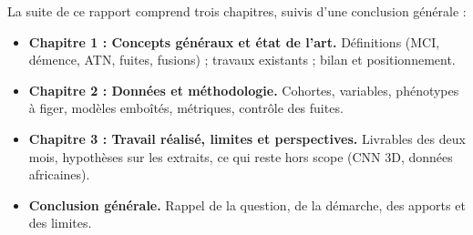 La suite de ce rapport comprend trois chapitres, suivis d'une conclusion générale :
\begin{itemize}
\item \textbf{Chapitre 1 : Concepts généraux et état de l'art.}
Définitions (MCI, démence, \ac{ATN}, fuites, fusions) ; travaux existants ; bilan et positionnement.

\item \textbf{Chapitre 2 : Données et méthodologie.}
Cohortes, variables, phénotypes à figer, modèles emboîtés, métriques, contrôle des fuites.

\item \textbf{Chapitre 3 : Travail réalisé, limites et perspectives.}
Livrables des deux mois, hypothèses sur les extraits, ce qui reste hors scope (CNN 3D, données africaines).

\item \textbf{Conclusion générale.}
Rappel de la question, de la démarche, des apports et des limites.
\end{itemize}

